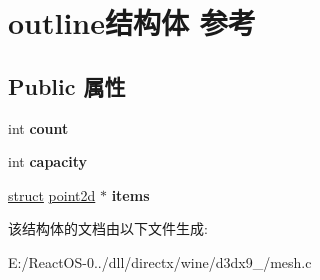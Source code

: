 \hypertarget{structoutline}{}\section{outline结构体 参考}
\label{structoutline}
\subsection*{Public 属性}
\begin{DoxyCompactItemize}
\item 
\mbox{\label{structoutline_a7abd52bf5ee9176de66493824efda6c2}} 
int {\bfseries count}
\item 
\mbox{\label{structoutline_a8201ee55a7a8e98ebab0d0133dac5e8f}} 
int {\bfseries capacity}
\item 
\mbox{\label{structoutline_a13a5443009a1befbf38a788e7f6a3981}} 
\hyperlink{interfacestruct}{struct} \hyperlink{structpoint2d}{point2d} $\ast$ {\bfseries items}
\end{DoxyCompactItemize}


该结构体的文档由以下文件生成\+:\begin{DoxyCompactItemize}
\item 
E\+:/\+React\+O\+S-\/0../dll/directx/wine/d3dx9\+\_/mesh.\+c\end{DoxyCompactItemize}
